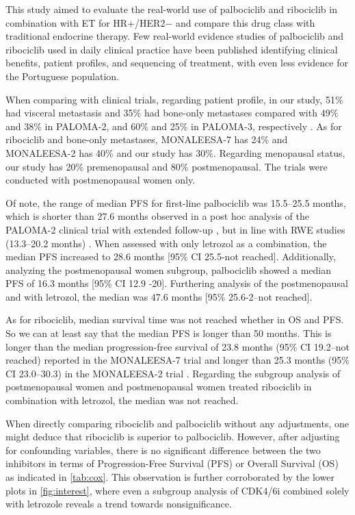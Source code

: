 This study aimed to evaluate the real-world use of palbociclib and ribociclib in combination with ET for HR+/HER2$-$ and compare this drug class with traditional endocrine therapy. Few real-world evidence studies of palbociclib and ribociclib used in daily clinical practice have been published identifying clinical benefits, patient profiles, and sequencing of treatment, with even less evidence for the Portuguese population.

When comparing with clinical trials, regarding patient profile, in our study, 51\% had visceral metastasis and 35\% had bone-only metastases compared with 49\% and 38\% in PALOMA-2, and 60\% and 25\% in PALOMA-3, respectively \cite{rugoImpactPalbociclibLetrozole2018,cristofanilliFulvestrantPalbociclibFulvestrant2016a}.
As for ribociclib and bone-only metastases, MONALEESA-7 \cite{tripathyRibociclibEndocrineTherapy2018} has 24\% and MONALEESA-2 has 40\% \cite{hortobagyiUpdatedResultsMONALEESA22018} and our study has 30\%.
Regarding menopausal status, our study has 20\% premenopausal and 80\% postmenopausal. The trials were conducted with postmenopausal women only.


Of note, the range of median PFS for first-line palbociclib was 15.5–25.5 months, which is shorter than 27.6 months observed in a post hoc analysis of the PALOMA-2 clinical trial with extended follow-up \cite{rugoImpactPalbociclibLetrozole2018}, but in line with RWE studies (13.3–20.2 months) \cite{harbeckCDK4InhibitorsHR2021}. When assessed with only letrozol as a combination, the median PFS increased to 28.6 months [95\% CI 25.5-not reached].
Additionally, analyzing the postmenopausal women subgroup, palbociclib showed a median PFS of 16.3 months [95\% CI 12.9 -20]. Furthering analysis of the postmenopausal and with letrozol, the median was 47.6 months [95\% 25.6-2–not reached].

As for ribociclib, median survival time was not reached whether in OS and PFS. So we can at least say that the median PFS is longer than 50 months. This is longer than the median progression-free survival of 23.8 months (95\% CI 19.2–not reached) reported in the MONALEESA-7 trial \cite{tripathyRibociclibEndocrineTherapy2018} and longer than  25.3 months (95\% CI 23.0–30.3) in the MONALEESA-2 trial \cite{hortobagyiUpdatedResultsMONALEESA22018}. 
Regarding the subgroup analysis of postmenopausal women and postmenopausal women treated ribociclib in combination with letrozol, the median was not reached.

When directly comparing ribociclib and palbociclib without any adjustments, one might deduce that ribociclib is superior to palbociclib. However, after adjusting for confounding variables, there is no significant difference between the two inhibitors in terms of Progression-Free Survival (PFS) or Overall Survival (OS) as indicated in \ref*{tab:cox}. This observation is further corroborated by the lower plots in \ref*{fig:interest}, where even a subgroup analysis of CDK4/6i combined solely with letrozole reveals a trend towards nonsignificance.

